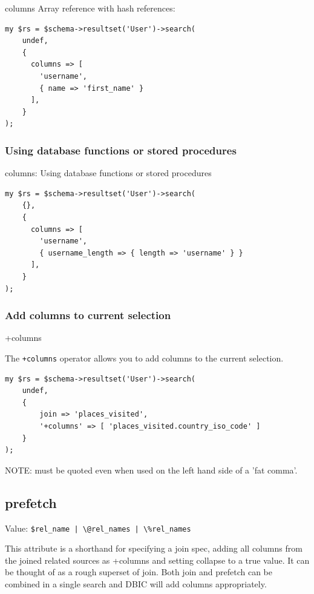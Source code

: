 \begin{frame}[fragile]{columns}
Array reference with hash references:

\begin{lstlisting}
my $rs = $schema->resultset('User')->search(
    undef,
    {
      columns => [
        'username',
        { name => 'first_name' }
      ],
    }
);
\end{lstlisting}
\end{frame}

\subsubsection{Using database functions or stored procedures}

\begin{frame}[fragile]{columns: Using database functions or stored
    procedures}
\begin{lstlisting}
my $rs = $schema->resultset('User')->search(
    {},
    {
      columns => [
        'username',
        { username_length => { length => 'username' } }
      ],
    }
);
\end{lstlisting}
\end{frame}

\subsubsection{Add columns to current selection}

\begin{frame}[fragile]{+columns}

The \verb|+columns| operator allows you to add columns to the current
selection.

\begin{lstlisting}
my $rs = $schema->resultset('User')->search(
    undef,
    {
        join => 'places_visited',
        '+columns' => [ 'places_visited.country_iso_code' ]
    }
);
\end{lstlisting}
\end{frame}

NOTE: must be quoted even when used on the left hand side of a 'fat comma'.

\subsection{prefetch}

Value: \verb=$rel_name | \@rel_names | \%rel_names=

This attribute is a shorthand for specifying a join spec, adding all columns
from the joined related sources as +columns and setting collapse to a true
value. It can be thought of as a rough superset of join. Both join and
prefetch can be combined in a single search and DBIC will add columns
appropriately.

